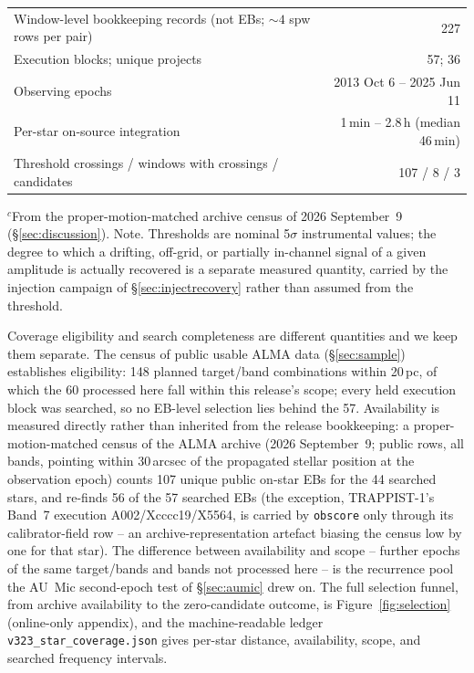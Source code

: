 \documentclass{openjournal}
\begin{document}
\begin{table}
\begin{tabular}{@{}l r@{}}
Window-level bookkeeping records (not EBs; ${\sim}4$ spw rows per pair) & 227 \\
Execution blocks; unique projects & 57; 36 \\
Observing epochs & 2013 Oct 6 -- 2025 Jun 11 \\
Per-star on-source integration & 1\,min -- 2.8\,h (median 46\,min) \\
Threshold crossings / windows with crossings / candidates & 107 / 8 / 3 \\
\hline
\end{tabular}
\par\vspace{3pt}
\parbox{\columnwidth}{\footnotesize $^{c}$From the proper-motion-matched
archive census of 2026 September~9 (\S\ref{sec:discussion}). Note.
Thresholds are nominal
5$\sigma$ instrumental values; the degree to which a drifting,
off-grid, or partially in-channel signal of a given amplitude is
actually recovered is a separate measured quantity, carried by the
injection campaign of \S\ref{sec:injectrecovery} rather than assumed
from the threshold.}
\end{table}


Coverage eligibility and search completeness are different quantities
and we keep them separate. The census of public usable ALMA data
(\S\ref{sec:sample}) establishes eligibility: 148 planned target/band
combinations within 20\,pc, of which the 60 processed here fall
within this release's scope; every held execution block was searched,
so no EB-level selection lies behind the 57. Availability is
measured directly rather than inherited from the release bookkeeping:
a proper-motion-matched census of the ALMA archive (2026
September~9; public rows, all bands, pointing within 30\,arcsec of
the propagated stellar position at the observation epoch) counts 107
unique public on-star EBs for the 44 searched stars, and re-finds 56
of the 57 searched EBs (the exception, TRAPPIST-1's Band~7 execution
A002/Xcccc19/X5564, is carried by \texttt{obscore} only through its
calibrator-field row -- an archive-representation artefact biasing
the census low by one for that star). The difference between
availability and scope -- further epochs of the same target/bands and
bands not processed here -- is the recurrence pool the AU~Mic
second-epoch test of \S\ref{sec:aumic} drew on. The full selection
funnel, from archive availability to the zero-candidate outcome, is
Figure~\ref{fig:selection} (online-only appendix), and the
machine-readable ledger \texttt{v323\_star\_coverage.json} gives
per-star distance, availability, scope, and searched frequency
intervals.
\end{document}
